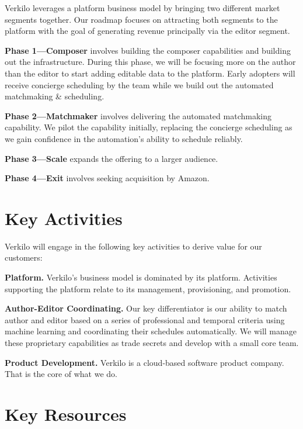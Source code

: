 \documentclass[11pt,openany]{book}
\begin{document}
Verkilo leverages a platform business model by bringing two different
market segments together. Our roadmap focuses on attracting both
segments to the platform with the goal of generating revenue principally
via the editor segment.

\textbf{Phase 1---Composer} involves building the composer capabilities
and building out the infrastructure. During this phase, we will be
focusing more on the author than the editor to start adding editable
data to the platform. Early adopters will receive concierge scheduling
by the team while we build out the automated matchmaking \& scheduling.

\textbf{Phase 2---Matchmaker} involves delivering the automated
matchmaking capability. We pilot the capability initially, replacing the
concierge scheduling as we gain confidence in the automation's ability
to schedule reliably.

\textbf{Phase 3---Scale} expands the offering to a larger audience.

\textbf{Phase 4---Exit} involves seeking acquisition by Amazon.

\newpage{}

\hypertarget{key-activities}{%
\section{Key Activities}\label{key-activities}}

Verkilo will engage in the following key activities to derive value for
our customers:

\textbf{Platform.} Verkilo's business model is dominated by its
platform. Activities supporting the platform relate to its management,
provisioning, and promotion.

\textbf{Author-Editor Coordinating.} Our key differentiator is our
ability to match author and editor based on a series of professional and
temporal criteria using machine learning and coordinating their
schedules automatically. We will manage these proprietary capabilities
as trade secrets and develop with a small core team.

\textbf{Product Development.} Verkilo is a cloud-based software product
company. That is the core of what we do.

\hypertarget{key-resources}{%
\section{Key Resources}\label{key-resources}}
\end{document}
